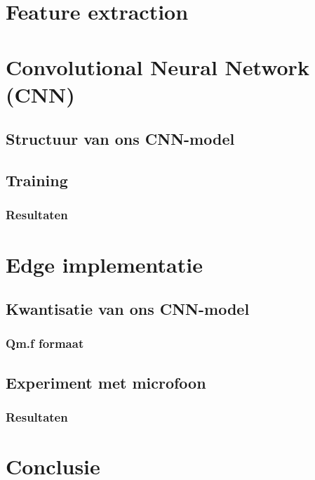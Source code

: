 \section{Feature extraction}

\section{Convolutional Neural Network (CNN)}

\subsection{Structuur van ons CNN-model}

\subsection{Training}
\subsubsection{Resultaten}


\section{Edge implementatie}

\subsection{Kwantisatie van ons CNN-model}
\subsubsection{Qm.f formaat}

\subsection{Experiment met microfoon}
\subsubsection{Resultaten}


\section{Conclusie}